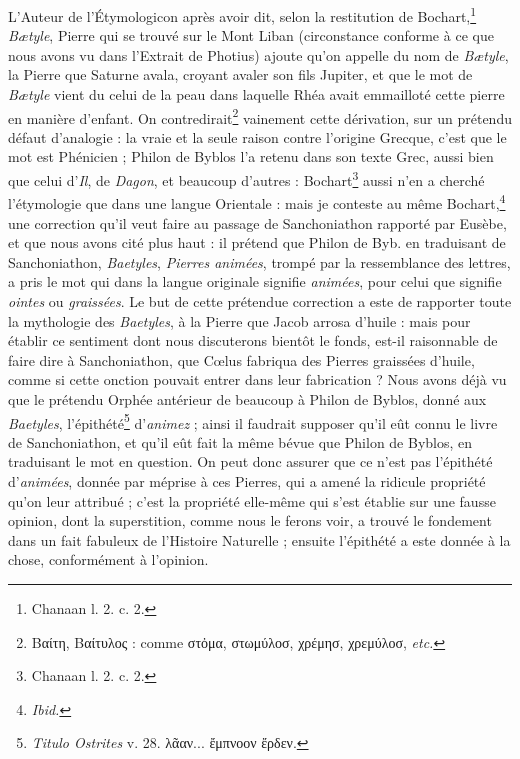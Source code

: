 \documentclass[a4paper, 11pt, oneside, polutonikogreek, french]{article}
\begin{document}
L'Auteur de l'Étymologicon après avoir dit, selon la restitution de Bochart,\footnote{Chanaan l. 2. c. 2.} \emph{Bætyle}, Pierre qui se trouvé sur le Mont Liban (circonstance conforme à ce que nous avons vu dans l'Extrait de Photius) ajoute qu'on appelle du nom de \emph{Bætyle}, la Pierre que Saturne avala, croyant avaler son fils Jupiter, et que le mot de \emph{Bætyle} vient du celui de la peau dans laquelle Rhéa avait emmailloté cette pierre en manière d'enfant. On contredirait\footnote{Βαίτη, Βαίτυλος : comme στὀμα, στωμύλοσ, χρέμησ, χρεμύλοσ, \emph{etc.}} vainement cette dérivation, sur un prétendu défaut d'analogie : la vraie et la seule raison contre l'origine Grecque, c'est que le mot est Phénicien ; Philon de Byblos l'a retenu dans son texte Grec, aussi bien que celui d'\emph{Il}, de \emph{Dagon}, et beaucoup d'autres : Bochart\footnote{Chanaan l. 2. c. 2.} aussi n'en a cherché l'étymologie que dans une langue Orientale : mais je conteste au même Bochart,\footnote{\emph{Ibid.}} une correction qu'il veut faire au passage de Sanchoniathon rapporté par Eusèbe, et que nous avons cité plus haut : il prétend que Philon de Byb. en traduisant de Sanchoniathon, \emph{Baetyles}, \emph{Pierres animées}, trompé par la ressemblance des lettres, a pris le mot qui dans la langue originale signifie \emph{animées}, pour celui que signifie \emph{ointes} ou \emph{graissées}. Le but de cette prétendue correction a este de rapporter toute la mythologie des \emph{Baetyles}, à la Pierre que Jacob arrosa d'huile : mais pour établir ce sentiment dont nous discuterons bientôt le fonds, est-il raisonnable de faire dire à Sanchoniathon, que Cœlus fabriqua des Pierres graissées d'huile, comme si cette onction pouvait entrer dans leur fabrication ? Nous avons déjà vu que le prétendu Orphée antérieur de beaucoup à Philon de Byblos, donné aux \emph{Baetyles}, l'épithété\footnote{\emph{Titulo Ostrites} v. 28. λᾶαν... ἔμπνοον ἔρδεν.} d'\emph{animez} ; ainsi il faudrait supposer qu'il eût connu le livre de Sanchoniathon, et qu'il eût fait la même bévue que Philon de Byblos, en traduisant le mot en question. On peut donc assurer que ce n'est pas l'épithété d'\emph{animées}, donnée par méprise à ces Pierres, qui a amené la ridicule propriété qu'on leur attribué ; c'est la propriété elle-même qui s'est établie sur une fausse opinion, dont la superstition, comme nous le ferons voir, a trouvé le fondement dans un fait fabuleux de l'Histoire Naturelle ; ensuite l'épithété a este donnée à la chose, conformément à l'opinion.
\end{document}
